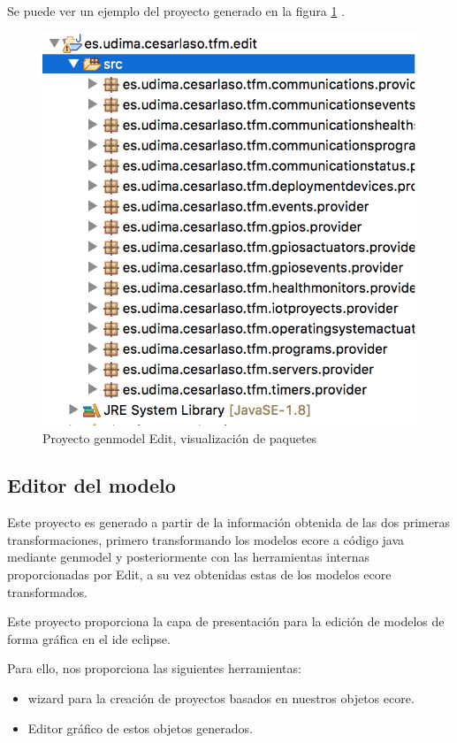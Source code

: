 Se puede ver un ejemplo del proyecto generado en la figura \ref{fig:modelo_genmodel_edit} .

\begin{figure}
	\centering
    \includegraphics[scale=0.4]{images/emf_capturas/genmodel_edit}
    \sourcepropia{}
    \caption{Proyecto genmodel Edit, visualización de paquetes}
    \label{fig:modelo_genmodel_edit}
\end{figure}



\subsection{Editor del modelo}

Este proyecto es generado a partir de la información obtenida de las dos primeras transformaciones, primero transformando los modelos \gls{ecore} a código java mediante genmodel y posteriormente con las herramientas internas proporcionadas por Edit, a su vez obtenidas estas de los modelos \gls{ecore} transformados.

Este proyecto proporciona la capa de presentación para la edición de modelos de forma gráfica en el \gls{ide} eclipse.

Para ello, nos proporciona las siguientes herramientas:
\begin{itemize}
    \item \Gls{wizard} para la creación de proyectos basados en nuestros objetos \gls{ecore}.
    \item Editor gráfico de estos objetos generados.
\end{itemize}

